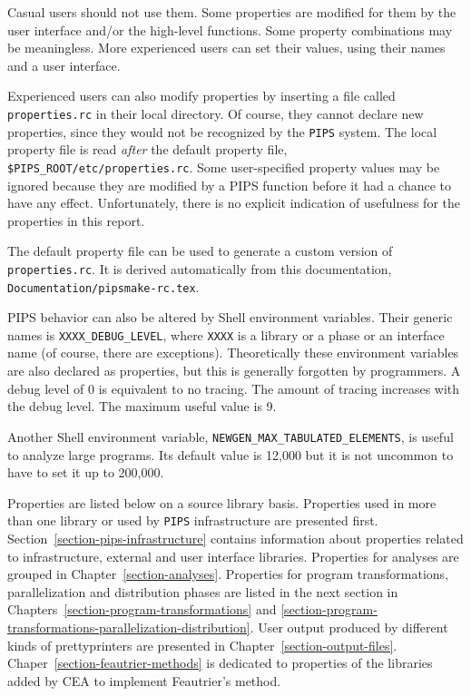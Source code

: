 \documentclass[a4paper]{report}
\begin{document}
Casual users should not use them. Some properties are modified for them by
the user interface and/or the high-level functions. Some property
combinations may be meaningless. More experienced users can set their
values, using their names and a user interface.

Experienced users can also modify properties by inserting a file
called \texttt{properties.rc} in their local directory. Of course,
they cannot declare new properties, since they would not be recognized
by the {\tt PIPS} system. The local property file is read \emph{after}
the default property file, \verb+$PIPS_ROOT/etc/properties.rc+.
Some user-specified property
values may be ignored because they are modified by a PIPS function before
it had a chance to have any effect. Unfortunately, there is no explicit
indication of usefulness for the properties in this report.

The default property file can be used to generate a custom version of
\texttt{properties.rc}. It is derived automatically from this documentation,
\verb+Documentation/pipsmake-rc.tex+.

PIPS behavior can also be altered by Shell environment variables. Their
generic names is \verb+XXXX_DEBUG_LEVEL+, where \verb+XXXX+ is a library
or a phase or an interface name (of course, there are
exceptions). Theoretically these environment variables are also declared
as properties, but this is generally forgotten by programmers. A debug
level of 0 is equivalent to no tracing. The amount of tracing increases
with the debug level. The maximum useful value is 9.

Another Shell environment variable, \verb+NEWGEN_MAX_TABULATED_ELEMENTS+,
is useful to analyze large programs. Its default value is 12,000 but it is
not uncommon to have to set it up to 200,000.

Properties are listed below on a source library basis. Properties used
in more than one library or used by {\tt PIPS} infrastructure are
presented first. Section~\ref{section-pips-infrastructure} contains
information about properties related to infrastructure, external and
user interface libraries. Properties for analyses are grouped in
Chapter~\ref{section-analyses}. Properties for program
transformations, parallelization and distribution phases are listed in
the next section in Chapters~\ref{section-program-transformations} and
\ref{section-program-transformations-parallelization-distribution}. User
output produced by different kinds of prettyprinters are presented in
Chapter~\ref{section-output-files}.
Chaper~\ref{section-feautrier-methods} is dedicated to properties of
the libraries added by CEA to implement Feautrier's method.
\end{document}
